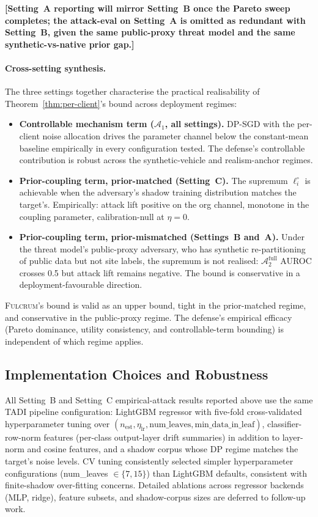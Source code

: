 \documentclass[letterpaper,journal]{IEEEtran}
\newcommand{\TADI}{\textsc{TADI}\xspace}
\newcommand{\Fulcrum}{\textsc{Fulcrum}\xspace}
\newcommand{\Adv}{\mathcal{A}}
\newcommand{\PLACE}[1]{\textcolor{red!75!black}{\textbf{[#1]}}}
\begin{document}
\PLACE{Setting~A reporting will mirror Setting~B once the Pareto
sweep completes; the attack-eval on Setting~A is omitted as
redundant with Setting~B, given the same public-proxy threat model
and the same synthetic-vs-native prior gap.}

\paragraph{Cross-setting synthesis.}
The three settings together characterise the practical realisability
of Theorem~\ref{thm:per-client}'s bound across deployment regimes:

\begin{itemize}[topsep=2pt,itemsep=2pt,leftmargin=*]
\item \textbf{Controllable mechanism term ($\Adv_1$, all settings).}
  DP-SGD with the per-client noise allocation drives the parameter
  channel below the constant-mean baseline empirically in every
  configuration tested. The defense's controllable contribution is
  robust across the synthetic-vehicle and realism-anchor regimes.
\item \textbf{Prior-coupling term, prior-matched (Setting~C).} The
  supremum $\ell_i^\circ$ is achievable when the adversary's shadow
  training distribution matches the target's. Empirically: attack
  lift positive on the org channel, monotone in the coupling
  parameter, calibration-null at $\eta=0$.
\item \textbf{Prior-coupling term, prior-mismatched (Settings~B
  and~A).} Under the threat model's public-proxy adversary, who has
  synthetic re-partitioning of public data but not site labels, the
  supremum is not realised: $\Adv_2^{\text{full}}$ AUROC crosses 0.5
  but attack lift remains negative. The bound is conservative in a
  deployment-favourable direction.
\end{itemize}

\Fulcrum's bound is valid as an upper bound, tight in the
prior-matched regime, and conservative in the public-proxy regime.
The defense's empirical efficacy (Pareto dominance, utility
consistency, and controllable-term bounding) is independent of which
regime applies.

\subsection{Implementation Choices and Robustness}
\label{sec:experiments-ablations}

All Setting~B and Setting~C empirical-attack results reported above
use the same \TADI pipeline configuration: LightGBM regressor with
five-fold cross-validated hyperparameter tuning over
$(n_{\text{est}}, \eta_{\text{lr}}, \text{num\_leaves}, \text{min\_data\_in\_leaf})$,
classifier-row-norm features (per-class output-layer drift summaries)
in addition to layer-norm and cosine features, and a shadow corpus
whose DP regime matches the target's noise levels. CV tuning
consistently selected simpler hyperparameter configurations
(num\_leaves $\in \{7,15\}$) than LightGBM defaults, consistent with
finite-shadow over-fitting concerns. Detailed ablations across
regressor backends (MLP, ridge), feature subsets, and shadow-corpus
sizes are deferred to follow-up work.
\end{document}
